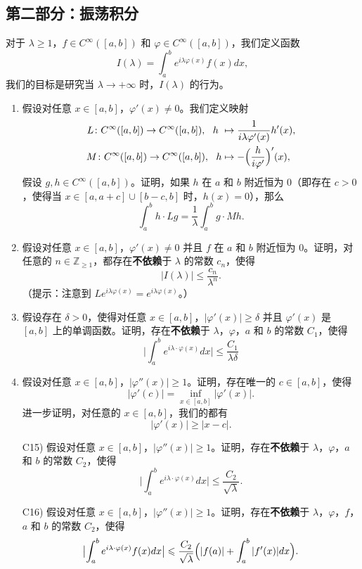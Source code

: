 \subsection{第二部分：振荡积分}

对于 $\lambda \geqslant 1$，$f\in C^\infty([a,b])$ 和 $\varphi \in C^\infty([a,b])$，我们定义函数
\[I(\lambda)=\int_{a}^b e^{i\lambda \varphi(x)}f(x)dx,\]
我们的目标是研究当 $\lambda \rightarrow +\infty$ 时，$I(\lambda)$ 的行为。

\begin{enumerate}[label=C\arabic*)]
\item 假设对任意 $x\in [a,b]$，$\varphi'(x)\neq 0$。我们定义映射
\begin{align*}
L\colon C^\infty([a,b]) \rightarrow C^\infty([a,b]), 	\ \ h  &\mapsto \frac{1}{i\lambda \varphi'(x)}h'(x),\\
M\colon C^\infty([a,b]) \rightarrow C^\infty([a,b]), \ \ h &\mapsto -\Bigl(\frac{h}{i \varphi'}\Bigr)'(x),\\
\end{align*}
假设 $g, h\in C^\infty([a,b])$。证明，如果 $h$ 在 $a$ 和 $b$ 附近恒为 $0$（即存在 $c>0$，使得当 $x\in [a,a+c]\cup [b-c,b]$ 时，$h(x)=0$），那么
\[\int_a^b h \cdot Lg  =\frac{1}{\lambda}\int_{a}^b g \cdot Mh.\]
\item 假设对任意 $x\in [a,b]$，$\varphi'(x)\neq 0$ 并且 $f$ 在 $a$ 和 $b$ 附近恒为 $0$。证明，对任意的 $n\in \mathbb{Z}_{\geqslant 1}$，都存在{\bf 不依赖}于 $\lambda$ 的常数 $c_n$，使得
\[|I(\lambda)|\leqslant \frac{c_n}{\lambda^n}.\]
（提示：注意到 $L e^{i\lambda\varphi(x)}=e^{i\lambda\varphi(x)}$。）
\item 假设存在 $\delta>0$，使得对任意 $x\in [a,b]$，$|\varphi'(x)|\geqslant \delta$ 并且 $\varphi'(x)$ 是 $[a,b]$ 上的单调函数。证明，存在{\bf 不依赖}于 $\lambda$，$\varphi$，$a$ 和 $b$ 的常数 $C_1$，使得
\[\bigl|\int_a^b e^{i\lambda\cdot \varphi(x)}dx\bigr|\leqslant \frac{C_1}{\lambda \delta}\]

\item 假设对任意 $x\in [a,b]$，$|\varphi''(x)|\geqslant 1$。证明，存在唯一的 $c\in [a,b]$，使得
\[|\varphi'(c)|=\displaystyle \inf_{x \in [a,b]}|\varphi'(x)|.\]
进一步证明，对任意的 $x\in [a,b]$，我们的都有
\[|\varphi'(x)|\geqslant |x-c|.\]

\item[C15)] 假设对任意 $x\in [a,b]$，$|\varphi''(x)|\geqslant 1$。证明，存在{\bf 不依赖}于 $\lambda$，$\varphi$，$a$ 和 $b$ 的常数 $C_2$，使得
\[\bigl|\int_a^b e^{i\lambda\cdot \varphi(x)}dx\bigr|\leqslant \frac{C_2}{\sqrt{\lambda}}.\]

\item[C16)] 假设对任意 $x\in [a,b]$，$|\varphi''(x)|\geqslant 1$。证明，存在{\bf 不依赖}于 $\lambda$，$\varphi$，$f$，$a$ 和 $b$ 的常数 $C_2$，使得
\[\bigl|\int_a^b e^{i\lambda\cdot \varphi(x)}f(x)dx\bigr|\leqslant \frac{C_2}{\sqrt{\lambda}}\Bigl(|f(a)|+\int_{a}^b |f'(x)| dx\Bigr).\]

\end{enumerate}
